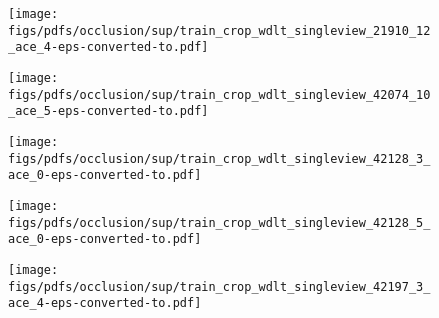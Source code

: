 \documentclass[runningheads]{llncs}
\begin{document}
\begin{figure*}[t!]
\begin{subfigure}[b]{0.16\linewidth}
    \end{subfigure}
    \begin{subfigure}[b]{0.16\linewidth}        \centering
        \texttt{[image: figs/pdfs/occlusion/sup/train\_crop\_wdlt\_singleview\_21910\_12\_ace\_4-eps-converted-to.pdf]}
    \end{subfigure}
    \begin{subfigure}[b]{0.16\linewidth}        \centering
        \texttt{[image: figs/pdfs/occlusion/sup/train\_crop\_wdlt\_singleview\_42074\_10\_ace\_5-eps-converted-to.pdf]}
    \end{subfigure}
    \begin{subfigure}[b]{0.16\linewidth}        \centering
        \texttt{[image: figs/pdfs/occlusion/sup/train\_crop\_wdlt\_singleview\_42128\_3\_ace\_0-eps-converted-to.pdf]}
    \end{subfigure}
    \begin{subfigure}[b]{0.16\linewidth}        \centering
        \texttt{[image: figs/pdfs/occlusion/sup/train\_crop\_wdlt\_singleview\_42128\_5\_ace\_0-eps-converted-to.pdf]}
    \end{subfigure}
    \begin{subfigure}[b]{0.16\linewidth}        \centering
        \texttt{[image: figs/pdfs/occlusion/sup/train\_crop\_wdlt\_singleview\_42197\_3\_ace\_4-eps-converted-to.pdf]}
    \end{subfigure} \\ \vspace{1mm}
    
    
    
    \begin{subfigure}[b]{0.16\linewidth}        \centering


        

\end{subfigure}
\end{figure*}
\end{document}
